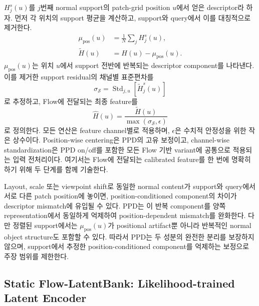 $H_j^s(u)$를 $j$번째 normal support의 patch-grid position $u$에서 얻은
descriptor라 하자. 먼저 각 위치의 support 평균을 계산하고, support와 query에서
이를 대칭적으로 제거한다.
\begin{align}
  \mu_{\mathrm{pos}}(u)
    &= \frac{1}{N}\sum_j H_j^s(u), \\
  \widetilde H(u)
    &= H(u)-\mu_{\mathrm{pos}}(u).
  \label{eq:ppd_centering}
\end{align}
$\mu_{\mathrm{pos}}(u)$는 위치 $u$에서 support 전반에 반복되는 descriptor
component를 나타낸다. 이를 제거한 support residual의 채널별 표준편차를
\begin{equation}
  \sigma_{\mathcal S}
    =\operatorname{Std}_{j,u}\!\left[\widetilde H_j^s(u)\right]
  \label{eq:ppd_scale}
\end{equation}
로 추정하고, Flow에 전달되는 최종 feature를
\begin{equation}
  \widehat H(u)
    =\frac{\widetilde H(u)}{\max(\sigma_{\mathcal S},\epsilon)}
  \label{eq:ppd_standardization}
\end{equation}
로 정의한다. 모든 연산은 feature channel별로 적용하며, $\epsilon$은 수치적
안정성을 위한 작은 상수이다. Position-wise centering은 PPD의 고유 보정이고,
channel-wise standardization은 PPD on/off를 포함한 모든 Flow 기반 variant에
공통으로 적용되는 입력 전처리이다. 여기서는 Flow에 전달되는 calibrated feature를
한 번에 명확히 하기 위해 두 단계를 함께 기술한다.

Layout, scale 또는 viewpoint shift로 동일한 normal content가 support와 query에서
서로 다른 patch position에 놓이면, position-conditioned component의 차이가
descriptor mismatch에 유입될 수 있다. PPD는 이 반복 component를 양쪽
representation에서 동일하게 억제하여 position-dependent mismatch를 완화한다.
다만 정렬된 support에서는 $\mu_{\mathrm{pos}}(u)$가 positional artifact뿐 아니라
반복적인 normal object structure도 포함할 수 있다. 따라서 PPD는 두 성분의 완전한
분리를 보장하지 않으며, support에서 추정한 position-conditioned component를
억제하는 보정으로 주장 범위를 제한한다.

\subsection{Static Flow-LatentBank: Likelihood-trained Latent Encoder}
\label{sec:latent_bank}

